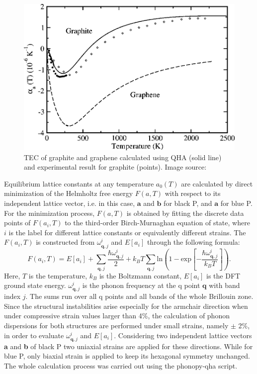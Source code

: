 \begin{figure}[htbp!] 
\centering
\includegraphics[width=0.8\linewidth]{qha_gra.png}%
\caption{ TEC of graphite and graphene calculated using QHA (solid line) and experimental result for graphite (points). Image source: \cite{QHA1} }
\label{fig:qha_gra}
\end{figure}

Equilibrium lattice constants at any temperature $a_0(T)$ are calculated by direct minimization of the Helmholtz free energy $F(a,T)$ with respect to its independent lattice vector, i.e. in this case, $\mathbf{a}$ and $\mathbf{b}$ for black P, and $\mathbf{a}$ for blue P. For the minimization process, $F(a,T)$ is obtained by fitting the discrete data points of $F({a_i,T})$ to the third-order Birch-Murnaghan equation of state, where $i$ is the label for different lattice constants or equivalently different strains. The $F({a_i,T})$ is constructed from $\omega^i_{\mathbf{q},j}$ and $E[a_i]$ through the following formula\cite{QHA0,QHA1}:
\begin{equation}\label{eq:free-enerji}
F({a_i,T}) = E[a_i]+\sum_{\mathbf{q},j}\frac{\hbar \omega^i_{\mathbf{q},j}}{2} +k_BT\sum_{\mathbf{q},j}\text{ln}\left( 1-\text{exp} \left[ -\frac{\hbar \omega^i_{\mathbf{q},j}}{k_BT} \right]\right).
\end{equation}
Here, $T$ is the temperature, $k_B$ is the Boltzmann constant, $E[a_i]$ is the DFT ground state energy. $\omega^i_{\mathbf{q},j}$ is the phonon frequency at the q point $\mathbf{q}$ with band index $j$. 
The sums  run over all q points and all bands of the whole Brillouin zone. Since the structural instabilities arise especially for the armchair direction when under compressive strain values larger than 4\%,  the calculation of phonon dispersions for both structures are performed under small strains, namely $\pm$ 2\%,  in order to evaluate $\omega^i_{\mathbf{q},j}$ and $E[a_i]$. Considering two independent lattice vectors \textbf{a} and \textbf{b} of black P two uniaxial strains are applied for these directions. While for blue P, only biaxial strain is applied to keep its hexagonal symmetry unchanged. The whole calculation process was carried out using the phonopy-qha script\cite{phonopy-qha}.

